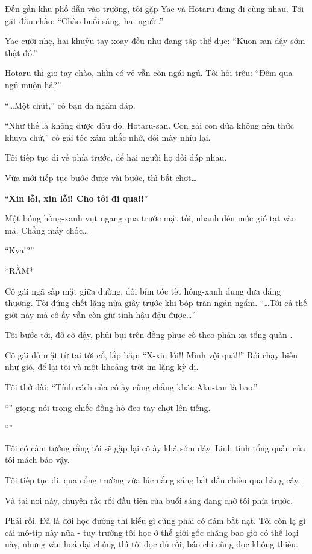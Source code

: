 \documentclass[../main.tex]{subfiles}
\begin{document}
Đến gần khu phố dẫn vào trường, tôi gặp Yae và Hotaru đang đi cùng nhau. Tôi gật đầu chào: ``Chào buổi sáng, hai người.''

Yae cười nhẹ, hai khuỷu tay xoay đều như đang tập thể dục: ``Kuon-san dậy sớm thật đó.''

Hotaru thì giơ tay chào, nhìn có vẻ vẫn còn ngái ngủ. Tôi hỏi trêu: ``Đêm qua ngủ muộn hả?''

``\dots Một chút,'' cô bạn da ngăm đáp.

``Như thế là không được đâu đó, Hotaru-san. Con gái con đứa không nên thức khuya chứ,'' cô gái tóc xám nhắc nhở, đôi mày nhíu lại.

Tôi tiếp tục đi về phía trước, để hai người họ đối đáp nhau.

Vừa mới tiếp tục bước được vài bước, thì bất chợt\dots

``\textbf{Xin lỗi, xin lỗi! Cho tôi đi qua!!}''

Một bóng hồng-xanh vụt ngang qua trước mặt tôi, nhanh đến mức gió tạt vào má. Chẳng mấy chốc\dots

``Kya!?''

*RẦM*

Cô gái ngã sấp mặt giữa đường, đôi bím tóc tết hồng-xanh đung đưa đáng thương. Tôi đứng chết lặng nửa giây trước khi bóp trán ngán ngẩm. ``\dots Tới cả thế giới này mà cô ấy vẫn còn giữ tính hậu đậu được\dots''

Tôi bước tới, đỡ cô dậy, phủi bụi trên đồng phục cô theo phản xạ tổng quản \hll .

Cô gái đỏ mặt từ tai tới cổ, lắp bắp: ``X-xin lỗi!! Mình vội quá!!'' Rồi chạy biến như gió, để lại tôi và một khoảng trời im lặng kỳ dị.

Tôi thở dài: ``Tính cách của cô ấy cũng chẳng khác Aku-tan là bao.''

``'' giọng nói trong chiếc đồng hò đeo tay chợt lên tiếng.

``''

Tôi có cảm tưởng rằng tôi sẽ gặp lại cô ấy khá sớm đấy. Linh tính tổng quản của tôi mách bảo vậy.

\ct

Tôi tiếp tục đi, qua cổng trường vừa lúc nắng sáng bắt đầu chiếu qua hàng cây.

Và tại nơi này, chuyện rắc rối đầu tiên của buổi sáng đang chờ tôi phía trước.

Phải rồi. Đã là đời học đường thì kiểu gì cũng phải có đám bắt nạt.
Tôi còn lạ gì cái mô-típ này nữa - tuy trường tôi học ở thế giới gốc chẳng bao giờ có thể loại này, nhưng văn hoá đại chúng thì tôi đọc đủ rồi, báo chí cũng đọc không thiếu.
\end{document}
